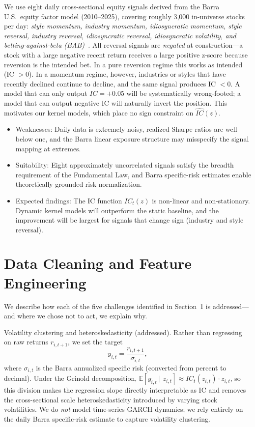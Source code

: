 \documentclass[11pt]{amsart}
\begin{document}
We use eight daily cross-sectional equity signals derived from the Barra
U.S.\ equity factor model (2010--2025), covering roughly 3,000 in-universe
stocks per day:
\emph{style momentum, industry momentum, idiosyncratic momentum, style
reversal, industry reversal, idiosyncratic reversal, idiosyncratic
volatility, and betting-against-beta (BAB)~\cite{FrazziniPedersen2014}.}
All reversal signals are \emph{negated} at construction---a stock with a
large negative recent return receives a large positive z-score because
reversion is the intended bet.  In a pure reversion regime this works as
intended (IC $> 0$).  In a momentum regime, however, industries or styles
that have recently declined continue to decline, and the same signal
produces IC $< 0$.  A model that can only output $IC = +0.05$ will be
systematically wrong-footed; a model that can output negative IC will
naturally invert the position.  This motivates our kernel models, which
place no sign constraint on $\widehat{IC}(z)$.

\begin{itemize}
  \item Weaknesses:  Daily data is extremely noisy, realized Sharpe
    ratios are well below one, and the Barra linear exposure structure may
    misspecify the signal mapping at extremes.
  \item Suitability:  Eight approximately uncorrelated signals
    satisfy the breadth requirement of the Fundamental Law, and Barra
    specific-risk estimates enable theoretically grounded risk normalization.
  \item Expected findings:  The IC function $IC_t(z)$ is non-linear
    and non-stationary.  Dynamic kernel models will outperform the static
    baseline, and the improvement will be largest for signals that change
    sign (industry and style reversal).
\end{itemize}

\section{Data Cleaning and Feature Engineering}

We describe how each of the five challenges identified in Section~1 is
addressed---and where we chose not to act, we explain why.

Volatility clustering and heteroskedasticity (addressed).\n
Rather than regressing on raw returns $r_{i,t+1}$, we set the target
\[
  y_{i,t} = \frac{r_{i,t+1}}{\sigma_{i,t}},
\]
where $\sigma_{i,t}$ is the Barra annualized specific risk (converted from
percent to decimal).  Under the Grinold decomposition,
$\mathbb{E}[y_{i,t} \mid z_{i,t}] \approx IC_t(z_{i,t}) \cdot z_{i,t}$,
so this division makes the regression slope directly interpretable as IC and
removes the cross-sectional scale heteroskedasticity introduced by varying
stock volatilities.  We do \emph{not} model time-series GARCH dynamics; we
rely entirely on the daily Barra specific-risk estimate to capture
volatility clustering.
\end{document}
